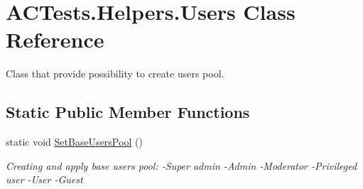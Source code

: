 \hypertarget{class_a_c_tests_1_1_helpers_1_1_users}{}\section{A\+C\+Tests.\+Helpers.\+Users Class Reference}
\label{class_a_c_tests_1_1_helpers_1_1_users}


Class that provide possibility to create users pool.  


\subsection*{Static Public Member Functions}
\begin{DoxyCompactItemize}
\item 
static void \mbox{\hyperlink{class_a_c_tests_1_1_helpers_1_1_users_a825c38d9936e2c662e837fff3f2ebd96}{Set\+Base\+Users\+Pool}} ()
\begin{DoxyCompactList}\small\item\em Creating and apply base users pool\+: -\/\+Super admin -\/\+Admin -\/\+Moderator -\/\+Privileged user -\/\+User -\/\+Guest \end{DoxyCompactList}\end{DoxyCompactItemize}
